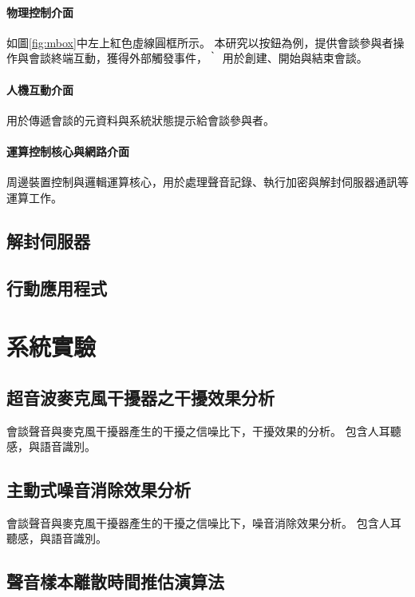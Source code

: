 \paragraph{物理控制介面}

    如圖\ref{fig:mbox}中左上紅色虛線圓框所示。
本研究以按鈕為例，提供會談參與者操作與會談終端互動，獲得外部觸發事件，｀
用於創建、開始與結束會談。

\paragraph{人機互動介面}

    用於傳遞會談的元資料與系統狀態提示給會談參與者。

\paragraph{運算控制核心與網路介面}

    周邊裝置控制與邏輯運算核心，用於處理聲音記錄、執行加密與解封伺服器通訊等運算工作。



\subsection{解封伺服器}


\subsection{行動應用程式}


\section{系統實驗}

\subsection{超音波麥克風干擾器之干擾效果分析}

    會談聲音與麥克風干擾器產生的干擾之信噪比下，干擾效果的分析。
包含人耳聽感，與語音識別。


\subsection{主動式噪音消除效果分析}

    會談聲音與麥克風干擾器產生的干擾之信噪比下，噪音消除效果分析。
包含人耳聽感，與語音識別。


\subsection{聲音樣本離散時間推估演算法}

